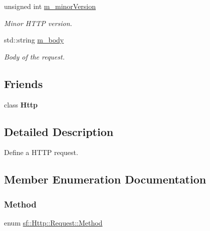 \begin{DoxyCompactItemize}
unsigned int \mbox{\hyperlink{classsf_1_1_http_1_1_request_a43358640d27bfba18c2fce2bcbb0de5b}{m\+\_\+minor\+Version}}
\begin{DoxyCompactList}\small\item\em Minor H\+T\+TP version. \end{DoxyCompactList}\item 
\mbox{\label{classsf_1_1_http_1_1_request_a3f4e4882547f34b7e6be3becdc291979}} 
std\+::string \mbox{\hyperlink{classsf_1_1_http_1_1_request_a3f4e4882547f34b7e6be3becdc291979}{m\+\_\+body}}
\begin{DoxyCompactList}\small\item\em Body of the request. \end{DoxyCompactList}\end{DoxyCompactItemize}
\subsection*{Friends}
\begin{DoxyCompactItemize}
\item 
\mbox{\label{classsf_1_1_http_1_1_request_aba95e2a7762bb5df986048b05d03a22e}} 
class {\bfseries Http}
\end{DoxyCompactItemize}


\subsection{Detailed Description}
Define a H\+T\+TP request. 

\begin{DoxyVerb}\end{DoxyVerb}
 

\subsection{Member Enumeration Documentation}
\mbox{\label{classsf_1_1_http_1_1_request_a620f8bff6f43e1378f321bf53fbf5598}} 
\subsubsection{\texorpdfstring{Method}{Method}}
{\footnotesize\ttfamily enum \mbox{\hyperlink{classsf_1_1_http_1_1_request_a620f8bff6f43e1378f321bf53fbf5598}{sf\+::\+Http\+::\+Request\+::\+Method}}}



